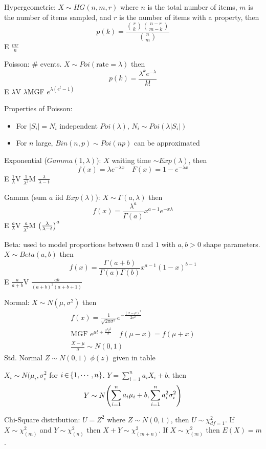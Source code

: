 \documentclass[letterpaper, 8pt]{extarticle}
\begin{document}
\begin{multicols*}{3}
	Hypergeometric: $X\sim HG(n,m,r)$ where $n$ is the total number of items, $m$ is the number of items sampled, and $r$ is the number of items with a property, then
	\[p(k)=\frac{\binom{r}{k}\binom{n-r}{m-k}}{\binom{n}{m}} \tag{$k\IN 0,\cdots, \min(r,m)$}\]
	E $\frac{mr}{n}$
	
	Poisson: \# events. $X\sim Poi(\text{rate}=\lambda)$ then
	\[p(k)=\frac{\lambda^ke^{-\lambda}}{k!}\]
	E $\lambda$\quad V $\lambda$\quad MGF $e^{\lambda(e^t-1)}$
	
	Properties of Poisson:
	\begin{itemize}
		\item For $|S_i|=N_i$ independent $Poi(\lambda)$, $N_i\sim Poi(\lambda|S_i|)$
		\item For $n$ large, $Bin(n,p)\sim Poi(np)$ can be approximated
	\end{itemize}
	
	Exponential ($Gamma(1,\lambda)$): $X$ waiting time $\sim Exp(\lambda)$, then 
	\[f(x)=\lambda e^{-\lambda x}\quad F(x)=1-e^{-\lambda x}\]
	E $\frac{1}{\lambda}$\quad V $\frac{1}{\lambda^2}$\quad M $\frac{\lambda}{\lambda-t}$
	
	Gamma (sum $a$ iid $Exp(\lambda)$): $X\sim \Gamma(a,\lambda)$ then
	\[f(x)=\frac{\lambda^a}{\Gamma(a)}x^{a-1}e^{-x\lambda}\]
	E $\frac{a}{\lambda}$\quad V $\frac{a}{\lambda^2}$\quad M $\mqty(\frac{\lambda}{\lambda-t})^a$
	
	Beta: used to model proportions between $0$ and $1$ with $a,b>0$ shape parameters. $X\sim Beta(a,b)$ then
	\[f(x)=\frac{\Gamma(a+b)}{\Gamma(a)\Gamma(b)}x^{a-1}(1-x)^{b-1}\]
	E $\frac{a}{a+b}$\quad V $\frac{ab}{(a+b)^2(a+b+1)}$
	
	Normal: $X\sim N(\mu, \sigma^2)$ then 
	\begin{gather*}
		f(x)=\frac{1}{\sqrt{2\pi\sigma^2}}e^{-\frac{(x-\mu)^2}{2\sigma^2}} \\
		\text{MGF } e^{\mu t+\frac{\sigma^2t^2}{2}}\quad f(\mu-x)=f(\mu+x) \\
		\frac{X-\mu}{\sigma}\sim N(0,1)
	\end{gather*}
	Std. Normal $Z\sim N(0,1)$ $\phi(z)$ given in table
	
	$X_i\sim N(\mu_i,\sigma^2_i$ for $i\,{\in}\,\{1,\cdots,n\}$. $Y=\sum_{i=1}^na_iX_i+b$, then
	\[Y\sim N\mqty(\displaystyle \sum_{i=1}^na_i\mu_i+b,\sum_{i=1}^na_i^2\sigma_i^2)\]
	
	Chi-Square distribution: $U=Z^2$ where $Z\sim N(0,1)$, then $U\sim\chi^2_{df=1}$. If $X\sim \chi^2_{(m)}$ and $Y\sim \chi^2_{(n)}$ then $X+Y\sim \chi^2_{(m+n)}$. If $X\sim\chi^2_{(m)}$ then $E(X)=m$.
	

\end{multicols*}
\end{document}
